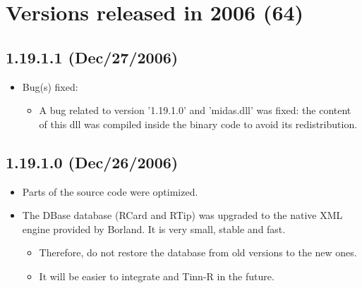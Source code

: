 
\hypertarget{2006}{}
\section{Versions released in 2006 (64)}
\subsection*{1.19.1.1 (Dec/27/2006)}
\begin{itemize}
  \item Bug(s) fixed:
    \begin{itemize}
      \item A bug related to version '1.19.1.0' and 'midas.dll' was fixed:
        the content of this dll was compiled inside the binary code to avoid
        its redistribution.
    \end{itemize}
\end{itemize}


\subsection*{1.19.1.0 (Dec/26/2006)}
\begin{itemize}
  \item Parts of the source code were optimized.
  \item The DBase database (RCard and RTip) was upgraded to the native XML engine
    provided by Borland. It is very small, stable and fast.
    \begin{itemize}
      \item Therefore, do not restore the database from old versions to the new
        ones.
      \item It will be easier to integrate \RR{} and Tinn-R in the future.
    \end{itemize}
\end{itemize}



